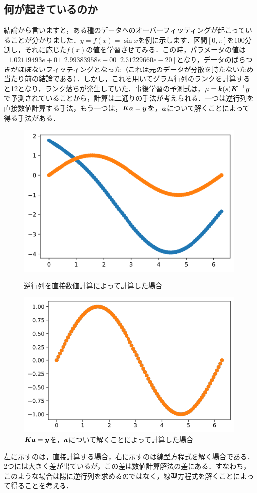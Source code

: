 \documentclass[11pt]{jsarticle}
\begin{document}
		\subsection{何が起きているのか}
			結論から言いますと，ある種のデータへのオーバーフィッティングが起こっていることが分かりました．$ y=f(x) = \sin x $を例に示します．区間$ [0,\pi] $を100分割し，それに応じた$ f(x) $の値を学習させてみる．この時，パラメータの値は$ [1.02119493e+01 \;\;  2.99383958e+00 \;\; 2.31229660e-20] $となり，データのばらつきがほぼないフィッティングとなった（これは元のデータが分散を持たないため当たり前の結論である）．しかし，これを用いてグラム行列のランクを計算すると12となり，ランク落ちが発生していた．事後学習の予測式は，$ \mu = \boldsymbol{k}(s) \boldsymbol{K}^{-1} \boldsymbol{y} $で予測されていることから，計算は二通りの手法が考えられる．一つは逆行列を直接数値計算する手法，もう一つは，$ \boldsymbol{K} \boldsymbol{a} = \boldsymbol{y} $を，$ \boldsymbol{a} $について解くことによって得る手法がある．
			\begin{figure}[htbp]
				\begin{minipage}{0.5\hsize}
					\centering
					\includegraphics[width = 0.7\columnwidth]{figure/caseCalcKinv.png}
					\caption{逆行列を直接数値計算によって計算した場合}
				\end{minipage}
					\begin{minipage}{0.5\hsize}
					\centering
					\includegraphics[width = 0.7\columnwidth]{figure/caseCalcLinearEq.png}
					\caption{$ \boldsymbol{K} \boldsymbol{a} = \boldsymbol{y} $を，$ \boldsymbol{a} $について解くことによって計算した場合}
				\end{minipage}
			\end{figure}
			左に示すのは，直接計算する場合，右に示すのは線型方程式を解く場合である．2つには大きく差が出ているが，この差は数値計算解法の差にある．すなわち，このような場合は陽に逆行列を求めるのではなく，線型方程式を解くことによって得ることを考える．
\end{document}
